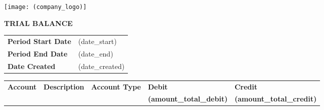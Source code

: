 \documentclass[english]{article}
\providecommand{\tabularnewline}{\\}
\begin{document}
\noindent \texttt{[image: (company\_logo)]}

\noindent \vspace{10mm}


\noindent \textbf{TRIAL BALANCE}

\noindent \vspace{10mm}


\noindent \begin{tabular}{ll}
\textbf{Period Start Date} & (date\_start) \tabularnewline
\textbf{Period End Date} & (date\_end) \tabularnewline
\textbf{Date Created} & (date\_created) \tabularnewline
\end{tabular}

\noindent \vspace{10mm}

\noindent \begin{tabular}{>{\raggedright}p{}>{\raggedright}p{}>{\raggedright}p{}>{\raggedright}p{}>{\raggedright}p{}}
\cline{1-5} 
\textbf{Account} & \textbf{Description} & \textbf{Account Type} & \textbf{Debit} & \textbf{Credit}\tabularnewline
\cline{1-5} 
\cline{1-5} 
 & & & \textbf{(amount\_total\_debit)} & \textbf{(amount\_total\_credit)}\tabularnewline
\cline{1-5} 
\end{tabular}

\noindent \vspace{5mm}
\end{document}
